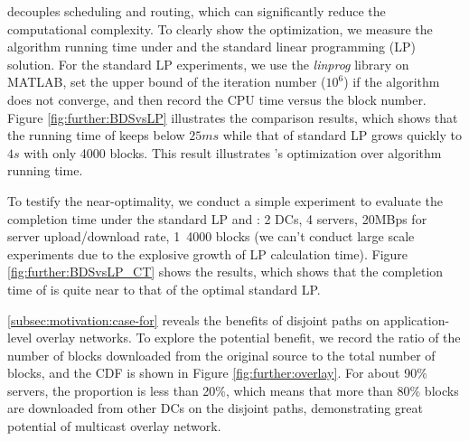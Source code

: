 \label{subsubsec:evaluation:depth}

 \name decouples scheduling and routing, which can significantly reduce the computational complexity. To clearly show the optimization, we measure the algorithm running time under \name and the standard linear programming (LP) solution. For the standard LP experiments, we use the \textit{linprog} library on MATLAB, set the upper bound of the iteration number ($10^6$) if the algorithm does not converge, and then record the CPU time versus the block number. Figure \ref{fig:further:BDSvsLP} illustrates the comparison results, which shows that the running time of \name keeps below $25ms$ while that of standard LP grows quickly to $4s$ with only 4000 blocks. This result illustrates \name's optimization over algorithm running time.

 To testify the near-optimality, we conduct a simple experiment to evaluate the completion time under the standard LP and \name: 2 DCs, 4 servers, 20MBps for server upload/download rate, 1~4000 blocks (we can't conduct large scale experiments due to the explosive growth of LP calculation time). Figure \ref{fig:further:BDSvsLP_CT} shows the results, which shows that the completion time of \name is quite near to that of the optimal standard LP.


 \Section\ref{subsec:motivation:case-for} reveals the benefits of disjoint paths on application-level overlay networks. To explore the potential benefit, we record the ratio of the number of blocks downloaded from the original source to the total number of blocks, and the CDF is shown in Figure \ref{fig:further:overlay}. For about 90\% servers, the proportion is less than 20\%, which means that more than 80\% blocks are downloaded from other DCs on the disjoint paths, demonstrating great potential of multicast overlay network.




